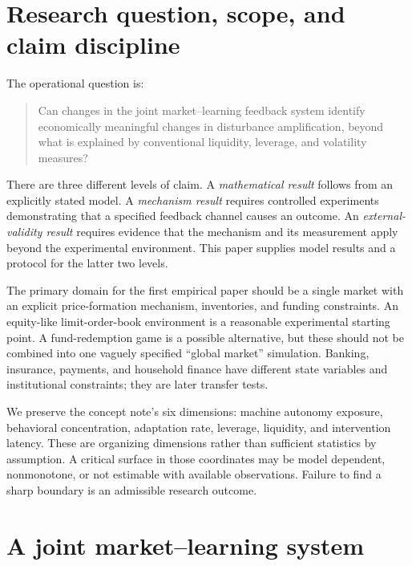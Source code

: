 \documentclass[11pt,a4paper]{article}
\theoremstyle{definition}
\theoremstyle{remark}
\begin{document}
\section{Research question, scope, and claim discipline}
\label{sec:scope}
The operational question is:
\begin{quote}
Can changes in the joint market--learning feedback system identify economically meaningful changes in disturbance amplification, beyond what is explained by conventional liquidity, leverage, and volatility measures?
\end{quote}
There are three different levels of claim. A \emph{mathematical result} follows from an explicitly stated model. A \emph{mechanism result} requires controlled experiments demonstrating that a specified feedback channel causes an outcome. An \emph{external-validity result} requires evidence that the mechanism and its measurement apply beyond the experimental environment. This paper supplies model results and a protocol for the latter two levels.

The primary domain for the first empirical paper should be a single market with an explicit price-formation mechanism, inventories, and funding constraints. An equity-like limit-order-book environment is a reasonable experimental starting point. A fund-redemption game is a possible alternative, but these should not be combined into one vaguely specified ``global market'' simulation. Banking, insurance, payments, and household finance have different state variables and institutional constraints; they are later transfer tests.

We preserve the concept note's six dimensions: machine autonomy exposure, behavioral concentration, adaptation rate, leverage, liquidity, and intervention latency. These are organizing dimensions rather than sufficient statistics by assumption. A critical surface in those coordinates may be model dependent, nonmonotone, or not estimable with available observations. Failure to find a sharp boundary is an admissible research outcome.

\section{A joint market--learning system}
\label{sec:model}
\end{document}
